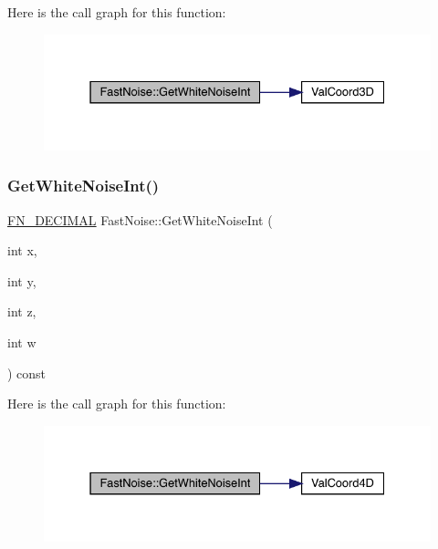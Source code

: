 Here is the call graph for this function\+:
\nopagebreak
\begin{figure}[H]
\begin{center}
\leavevmode
\includegraphics[width=331pt]{d1/dd8/class_fast_noise_a1c0a782e7675a58f6fe777eb6fa06eaf_cgraph}
\end{center}
\end{figure}
\mbox{\label{class_fast_noise_aa2e897b4faa4687260314dc1572301ec}} 
\subsubsection{\texorpdfstring{Get\+White\+Noise\+Int()}{GetWhiteNoiseInt()}\hspace{0.1cm}{\footnotesize\ttfamily [3/3]}}
{\footnotesize\ttfamily \mbox{\hyperlink{_fast_noise_8h_a75a9ef6d2541c4921815b885bfd449c3}{F\+N\+\_\+\+D\+E\+C\+I\+M\+AL}} Fast\+Noise\+::\+Get\+White\+Noise\+Int (\begin{DoxyParamCaption}\item[{int}]{x,  }\item[{int}]{y,  }\item[{int}]{z,  }\item[{int}]{w }\end{DoxyParamCaption}) const}

Here is the call graph for this function\+:
\nopagebreak
\begin{figure}[H]
\begin{center}
\leavevmode
\includegraphics[width=331pt]{d1/dd8/class_fast_noise_aa2e897b4faa4687260314dc1572301ec_cgraph}
\end{center}
\end{figure}
\mbox{\label{class_fast_noise_ad264b1bd7c819f7d5d9b5d5695a140a8}} 
